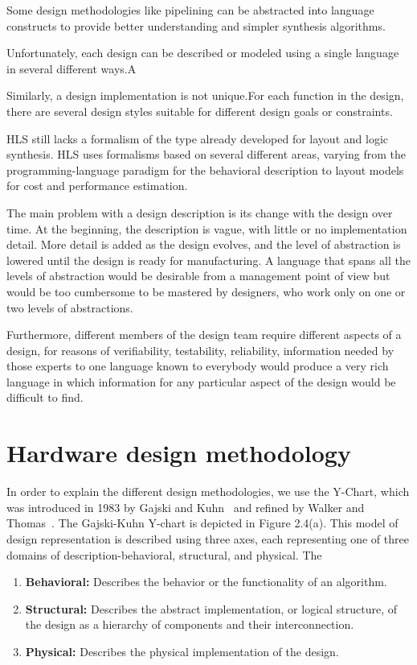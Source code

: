 Some design methodologies like pipelining can be abstracted into language constructs to provide better understanding and simpler synthesis algorithms.

Unfortunately, each design can be described or modeled using a single language in several different ways.A

Similarly, a design implementation is not unique.For each function in the design, there are several design styles suitable for different design goals or constraints.

HLS still lacks a formalism of the type already developed for layout and logic synthesis. HLS uses formalisms based on several different areas, varying from the programming-language paradigm for the behavioral description to layout models for cost and performance estimation.


The main problem with a design description is its change with the design over time. At the beginning, the description is vague, with little or no implementation detail. More detail is added as the design evolves, and the level of abstraction is lowered until the design is ready for manufacturing. A language that spans all the levels of abstraction would be desirable from a management point of view but would be too cumbersome to be mastered by designers, who work only on one or two levels of abstractions.

Furthermore, different members of the design team require different aspects of a design, for reasons of verifiability, testability, reliability, information needed by those experts to one language known to everybody would produce a very rich language in which information for any particular aspect of the design would be difficult to find.

\section{Hardware design methodology}

In order to explain the different design methodologies, we use the Y-Chart, which was introduced in 1983 by Gajski and Kuhn~\cite{gajski_1992_high} and refined by Walker and Thomas~\cite{walker_1985_y_model}.
The Gajski-Kuhn Y-chart is depicted in Figure 2.4(a). This model of design representation is described using three axes, each representing one of three domains of description-behavioral, structural, and physical. The

\begin{enumerate}
    \item \textbf{Behavioral: } Describes the behavior or the functionality of an algorithm.
    \item \textbf{Structural: } Describes the abstract implementation, or logical structure, of the design as a hierarchy of components and their interconnection.
    \item \textbf{Physical: }  Describes the physical implementation of the design.
\end{enumerate}
